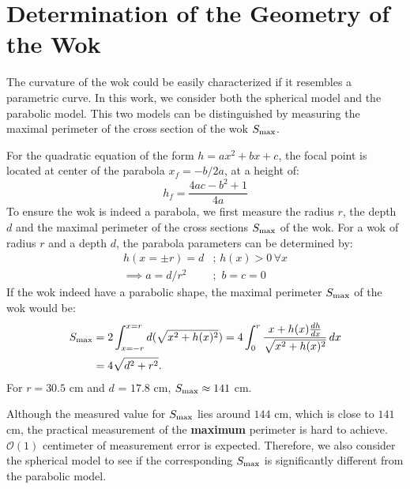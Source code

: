 \documentclass[12pt]{article}
\begin{document}
    \appendix
    \section{Determination of the Geometry of the Wok} \label{app: wok-geometry}
    The curvature of the wok could be easily characterized if it resembles a parametric curve.
    In this work, we consider both the spherical model and the parabolic model.
    This two models can be distinguished by measuring the maximal perimeter of the cross section of the wok $S_{\rm max}$. 
    
    For the quadratic equation of the form $h = ax^2 + bx + c$, the focal point is located at center of the parabola $x_f=-b/2a$, at a height of:
    \begin{equation} \label{eq: focal-parabola}
        h_f = \frac{4ac-b^2 + 1}{4a}
    \end{equation}
    To ensure the wok is indeed a parabola, we first measure the radius $r$, the depth $d$ and the maximal perimeter of the cross sections $S_{\rm max}$ of the wok.
    For a wok of radius $r$ and a depth $d$, the parabola parameters can be determined by:
    \begin{align}
        h(x= \pm r) = d &; \, h(x) > 0 \, \forall x \\
        \implies a = d/r^2 &; \,\, b=c=0 
    \end{align}
    If the wok indeed have a parabolic shape, the maximal perimeter $S_{\rm max}$ of the wok would be:
    \begin{equation}
    \begin{split}
        S_{\rm max} &= 2\int^{x=r}_{x=-r} d( \sqrt{x^2+h(x)^2} ) = 4\int^{r}_{0} \frac{x + h(x)\frac{dh}{dx} }{\sqrt{x^2+h(x)^2}} \, dx \\
        &= 4\sqrt{d^2+r^2}.
    \end{split} 
    \end{equation}
    For $r=30.5$ cm and $d$ = $17.8$ cm, $S_{\rm max} \approx 141 $ cm.
    
    Although the measured value for $S_{\rm max}$ lies around $144$ cm, which is close to $141$ cm, the practical measurement of the \textbf{maximum} perimeter is hard to achieve. $\mathcal{O}(1)$ centimeter of measurement error is expected. 
    Therefore, we also consider the spherical model to see if the corresponding $S_{\rm max}$ is significantly different from the parabolic model.
    
\end{document}
